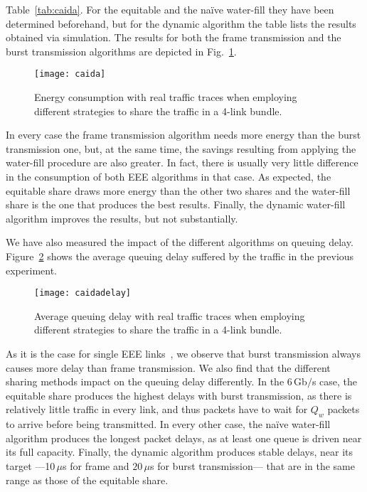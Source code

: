 \documentclass[journal,english,twocolumn,10pt,letterpaper]{IEEEtran}
\newcommand{\added}[1]{{#1}}
\begin{document}
Table~\ref{tab:caida}. For the equitable and the naïve water-fill they have
been determined beforehand, but for the dynamic algorithm the table lists the
results obtained via simulation. The results for both the frame transmission
and the burst transmission algorithms are depicted in
\added{Fig.}~\ref{fig:caida}.
\begin{figure}
  \centering
  \texttt{[image: caida]}
  \caption{Energy consumption with real traffic traces when employing
    different strategies to share the traffic in a 4-link bundle.}
  \label{fig:caida}
\end{figure}
In every case the frame transmission algorithm needs more energy than the
burst transmission one, but, at the same time, the savings resulting from
applying the water-fill procedure are also greater. In fact, there is usually
very little difference in the consumption of both EEE algorithms in that case.
As expected, the equitable share draws more energy than the other two shares
and the water-fill share is the one that produces the best results. Finally,
the dynamic water-fill algorithm improves the results, but not substantially.
 
We have also measured the impact of the different algorithms on queuing delay.
Figure~\ref{fig:caida-delay} shows the average queuing delay suffered by the
traffic in the previous experiment.
\begin{figure}
  \centering
  \texttt{[image: caidadelay]}
  \caption{Average queuing delay with real traffic traces when employing
    different strategies to share the traffic in a 4-link bundle.}
  \label{fig:caida-delay}
\end{figure}
As it is the case for single EEE
links~\cite{herreria12:_gi_g_model_gb_energ_effic_ether}, we observe that
burst transmission always causes more delay than frame transmission. We also
find that the different sharing methods impact on the queuing delay
differently. \added{In the 6$\,$Gb$/$s case, the equitable share produces the
  highest delays with burst transmission, as there is relatively little
  traffic in every link, and thus packets have to wait for $Q_w$ packets to
  arrive before being transmitted. In every other case, the naïve water-fill
  algorithm produces the longest packet delays, as at least one queue is
  driven near its full capacity. Finally, the dynamic algorithm produces
  stable delays, near its target ---10$\,\mu$s for frame and $20\,\mu$s for
  burst transmission--- that are in the same range as those of the equitable
  share.}
\end{document}
